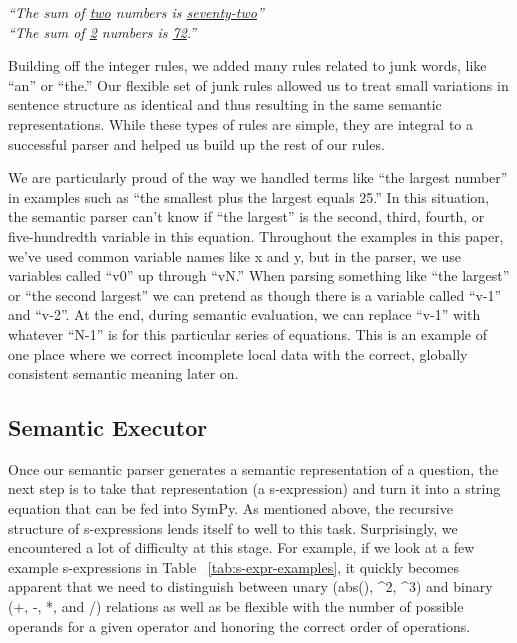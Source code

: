 \documentclass[11pt]{article}
\begin{document}
\begin{center}
    \textit{``The sum of \underline{two} numbers is \underline{seventy-two}''\\
    ``The sum of \underline{2} numbers is \underline{72}.''}
\end{center}

Building off the integer rules, we added many rules related to junk words, like ``an'' or ``the.'' Our flexible set of junk rules allowed us to treat small variations in sentence structure as identical and thus resulting in the same semantic representations. While these types of rules are simple, they are integral to a successful parser and helped us build up the rest of our rules.

We are particularly proud of the way we handled terms like ``the largest number'' in examples such as ``the smallest plus the largest equals 25.'' In this situation, the semantic parser can't know if ``the largest'' is the second, third, fourth, or five-hundredth variable in this equation. Throughout the examples in this paper, we've used common variable names like x and y, but in the parser, we use variables called ``v0'' up through ``vN.'' When parsing something like ``the largest'' or ``the second largest'' we can pretend as though there is a variable called ``v-1'' and ``v-2''. At the end, during semantic evaluation, we can replace ``v-1'' with whatever ``N-1'' is for this particular series of equations. This is an example of one place where we correct incomplete local data with the correct, globally consistent semantic meaning later on.

\subsection{Semantic Executor}
Once our semantic parser generates a semantic representation of a question, the next step is to take that representation (a s-expression) and turn it into a string equation that can be fed into SymPy. As mentioned above, the recursive structure of s-expressions lends itself to well to this task. Surprisingly, we encountered a lot of difficulty at this stage. For example, if we look at a few example s-expressions in Table ~\ref{tab:s-expr-examples}, it quickly becomes apparent that we need to distinguish between unary (abs(), \string^2, \string^3) and binary (+, -, *, and /) relations as well as be flexible with the number of possible operands for a given operator and honoring the correct order of operations.
\end{document}
